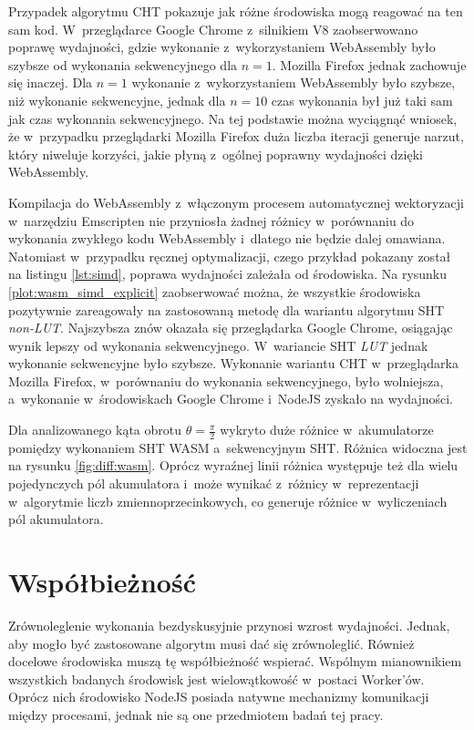 Przypadek algorytmu CHT pokazuje jak różne środowiska mogą reagować na ten sam kod. W~przeglądarce Google Chrome z~silnikiem V8 zaobserwowano poprawę wydajności, gdzie wykonanie z~wykorzystaniem WebAssembly było  szybsze od wykonania sekwencyjnego dla $n = 1$. Mozilla Firefox jednak zachowuje się inaczej. Dla $n = 1$ wykonanie z~wykorzystaniem WebAssembly było  szybsze, niż wykonanie sekwencyjne, jednak dla $n = 10$ czas wykonania był już taki sam jak czas wykonania sekwencyjnego. Na tej podstawie można wyciągnąć wniosek, że w~przypadku przeglądarki Mozilla Firefox duża liczba iteracji generuje narzut, który niweluje korzyści, jakie płyną z~ogólnej poprawny wydajności dzięki WebAssembly. 

Kompilacja do WebAssembly z~włączonym procesem automatycznej wektoryzacji w~narzędziu Emscripten nie przyniosła żadnej różnicy w~porównaniu do wykonania zwykłego kodu WebAssembly i~dlatego nie będzie dalej omawiana. Natomiast w~przypadku ręcznej optymalizacji, czego przykład pokazany został na listingu \ref{lst:simd}, poprawa wydajności zależała od środowiska. Na rysunku \ref{plot:wasm_simd_explicit} zaobserwować można, że wszystkie środowiska pozytywnie zareagowały na zastosowaną metodę dla wariantu algorytmu SHT \textit{non-LUT}. Najszybsza znów okazała się przeglądarka Google Chrome, osiągając wynik  lepszy od wykonania sekwencyjnego. W~wariancie SHT \textit{LUT} jednak wykonanie sekwencyjne było  szybsze. Wykonanie wariantu CHT w~przeglądarka Mozilla Firefox, w~porównaniu do wykonania sekwencyjnego, było wolniejsza, a~wykonanie w~środowiskach Google Chrome i~NodeJS zyskało na wydajności.

Dla analizowanego kąta obrotu $\theta = \frac{\pi}{2}$ wykryto duże różnice w~akumulatorze pomiędzy wykonaniem SHT WASM a~sekwencyjnym SHT. Różnica widoczna jest na rysunku \ref{fig:diff:wasm}. Oprócz wyraźnej linii różnica występuje też dla wielu pojedynczych pól akumulatora i~może wynikać z~różnicy w~reprezentacji w~algorytmie liczb zmiennoprzecinkowych, co generuje różnice w~wyliczeniach pól akumulatora.

\section{Współbieżność}

Zrównoleglenie wykonania bezdyskusyjnie przynosi wzrost wydajności. Jednak, aby mogło być zastosowane algorytm musi dać się zrównoleglić. Również docelowe środowiska muszą tę współbieżność wspierać. Wspólnym mianownikiem wszystkich badanych środowisk jest wielowątkowość w~postaci Worker'ów. Oprócz nich środowisko NodeJS posiada natywne mechanizmy komunikacji między procesami, jednak nie są one przedmiotem badań tej pracy.

